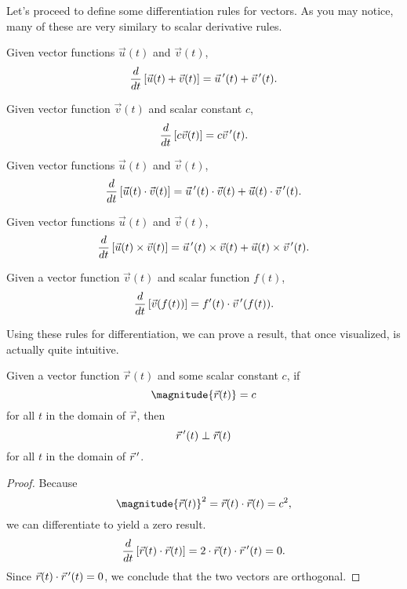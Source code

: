 Let's proceed to define some differentiation rules for vectors. As you may notice, many of these are very similary to scalar derivative rules.

\begin{proposition}
    Given vector functions $\vec{u}(t)$ and $\vec{v}(t)$,
    \[\frac{d}{dt}\left[\vec{u}(t) + \vec{v}(t)\right] = \vec{u}\,^{\prime}(t) + \vec{v}\,^{\prime}(t).\]
\end{proposition}

\begin{proposition}
    Given vector function $\vec{v}(t)$ and scalar constant $c$,
    \[\frac{d}{dt}\left[c\vec{v}(t)\right] = c\vec{v}\,^{\prime}(t).\]
\end{proposition}

\begin{proposition}
    Given vector functions $\vec{u}(t)$ and $\vec{v}(t)$,
    \[\frac{d}{dt}\left[\vec{u}(t) \cdot \vec{v}(t)\right] = \vec{u}\,^{\prime}(t) \cdot \vec{v}(t) + \vec{u}(t) \cdot \vec{v}\,^{\prime}(t).\]
\end{proposition}

\begin{proposition}
    Given vector functions $\vec{u}(t)$ and $\vec{v}(t)$,
    \[\frac{d}{dt}\left[\vec{u}(t) \times \vec{v}(t)\right] = \vec{u}\,^{\prime}(t) \times \vec{v}(t) + \vec{u}(t) \times \vec{v}\,^{\prime}(t).\]
\end{proposition}

\begin{proposition}
    Given a vector function $\vec{v}(t)$ and scalar function $f(t)$,
    \[\frac{d}{dt}\left[\vec{v}(f(t))\right] = f^{\prime}(t)\cdot \vec{v}\,^{\prime}(f(t)).\]
\end{proposition}

Using these rules for differentiation, we can prove a result, that once visualized, is actually quite intuitive.

\begin{theorem}
    Given a vector function $\vec{r}(t)$ and some scalar constant $c$, if
    \[\magnitude{\vec{r}(t)} = c\]
    for all $t$ in the domain of $\vec{r}$, then
    \[\vec{r}\,^{\prime}(t) \perp \vec{r}(t)\]
    for all $t$ in the domain of $\vec{r}\,^{\prime}$.
\end{theorem}

\begin{proof}
    Because
    \[\magnitude{\vec{r}(t)}^{2} = \vec{r}(t) \cdot \vec{r}(t) = c^{2},\]
    we can differentiate to yield a zero result.
    \[\frac{d}{dt}\left[\vec{r}(t) \cdot \vec{r}(t)\right] = 2 \cdot \vec{r}(t) \cdot \vec{r}\,^{\prime}(t) = 0.\]
    Since $\vec{r}(t) \cdot \vec{r}\,^{\prime}(t) = 0$, we conclude that the two vectors are orthogonal.
\end{proof}